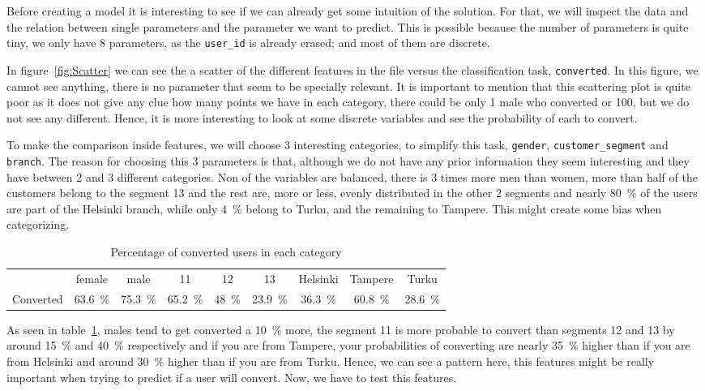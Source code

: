 \documentclass{article}
\begin{document}
Before creating a model it is interesting to see if we can already get some intuition of the solution. For that, we will inspect the data and the relation between single parameters and the parameter we want to predict. This is possible because the number of parameters is quite tiny, we only have 8 parameters, as the \texttt{user\_id} is already erased; and most of them are discrete.

In figure~\ref{fig:Scatter} we can see the a scatter of the different features in the file versus the classification task, \texttt{converted}. In this figure, we cannot see anything, there is no parameter that seem to be specially relevant. It is important to mention that this scattering plot is quite poor as it does not give any clue how many points we have in each category, there could be only 1 male who converted or 100, but we do not see any different. Hence, it is more interesting to look at some discrete variables and see the probability of each to convert.

To make the comparison inside features, we will choose 3 interesting categories, to simplify this task, \texttt{gender}, \texttt{customer\_segment} and \texttt{branch}. The reason for choosing this 3 parameters is that, although we do not have any prior information they seem interesting and they have between 2 and 3 different categories. Non of the variables are balanced, there is 3 times more men than women, more than half of the customers belong to the segment 13 and the rest are, more or less, evenly distributed in the other 2 segments and nearly 80~\% of the users are part of the Helsinki branch, while only 4~\% belong to Turku, and the remaining to Tampere. This might create some bias when categorizing.

\begin{table}[!h]
\begin{center}
\begin{tabular}{ c | c  c | c c c | c c c}
  & female & male & 11 & 12 & 13 & Helsinki & Tampere & Turku \\
 Converted & 63.6~\% & 75.3~\% &  65.2~\% & 48~\% & 23.9~\% & 36.3~\% & 60.8~\% & 28.6~\%
\end{tabular}
\caption{\label{tab:perc}Percentage of converted users in each category}
\end{center}
\end{table}

As seen in table~\ref{tab:perc}, males tend to get converted a 10~\% more, the segment 11 is more probable to convert than segments 12 and 13 by around 15~\% and 40~\% respectively and if you are from Tampere, your probabilities of converting are nearly 35~\% higher than if you are from Helsinki and around 30~\% higher than if you are from Turku. Hence, we can see a pattern here, this features might be really important when trying to predict if a user will convert. Now, we have to test this features.
\end{document}
